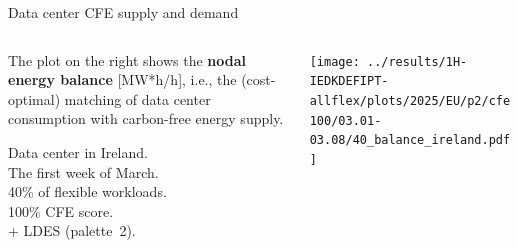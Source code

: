\begin{frame}{Data center CFE supply and demand}
  \label{nbp2-IE-40}

  {\footnotesize
  
  \begin{columns}[T]
    \begin{column}{3.5cm}
      \vspace{0.3cm}
      The plot on the right shows the {\bf nodal energy balance} [MW*h/h], i.e., the (cost-optimal) matching of data center consumption with carbon-free energy supply.

      \vspace{0.2cm}
      Data center in Ireland. \\
      The first week of March. \\
      40\% of flexible workloads.\\
      100\% CFE score.\\
      + LDES (palette~2). \\

    \end{column}
  
    \begin{column}{11cm}
      \texttt{[image: ../results/1H-IEDKDEFIPT-allflex/plots/2025/EU/p2/cfe100/03.01-03.08/40\_balance\_ireland.pdf]}
    \end{column}
    \end{columns}
    } 

\end{frame}


